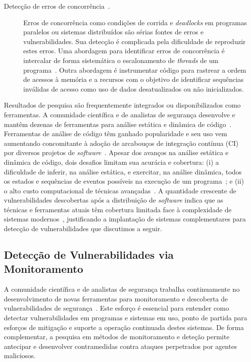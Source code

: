 \begin{description}
  \item[Detecção de erros de concorrência~\cite{silva2020shake, cai2021sound}.] Erros de concorrência como condições de corrida e \emph{deadlocks} em programas paralelos ou sistemas distribuídos são sérias fontes de erros e vulnerabilidades. Sua detecção é complicada pela dificuldade de reproduzir estes erros. Uma abordagem para identificar erros de concorrência é intercalar de forma sistemática o escalonamento de \emph{threads} de um programa~\cite{chen2020muzz, gong2021snowboard}. Outra abordagem é instrumentar código para rastrear a ordem de acessos à memória e a recursos com o objetivo de identificar sequências inválidas de acesso como uso de dados desatualizados ou não inicializados.

\end{description}

Resultados de pesquisa são frequentemente integrados ou disponibilizados como ferramentas. A comunidade científica e de analistas de segurança desenvolve e mantêm dezenas de ferramentas para análise estática e dinâmica de código~\cite{beller16static, gosain15dynamic}. Ferramentas de análise de código têm ganhado popularidade e seu uso vem aumentando concomitante à adoção de arcabouços de integração contínua (CI) por diversos projetos de \emph{software}~\cite{sadowski2018lessons, zampetti2017open}. Apesar dos avanços na análise estática e dinâmica de código, dois desafios limitam sua acurácia e cobertura: (i) a dificuldade de inferir, na análise estática, e exercitar, na análise dinâmica, todos os estados e sequências de eventos possíveis na execução de um programa~\cite{chen2020muzz}; e (ii) o alto custo computacional de técnicas avançadas~\cite{stein2021demanded}.
A quantidade crescente de vulnerabilidades descobertas após a distribuição de \emph{software} indica que as técnicas e ferramentas atuais têm cobertura limitada face à complexidade de sistemas modernos~\cite{votipka18vuln, li18vuldeepecker}, justificando a implantação de sistemas complementares para detecção de vulnerabilidades que discutimos a seguir.

\subsection{Detecção de Vulnerabilidades via Monitoramento}\label{sec:art.detect}

A comunidade científica e de analistas de segurança trabalha continuamente no desenvolvimento de novas ferramentas para monitoramento e descoberta de vulnerabilidades de segurança~\cite{bau10scanning, doupe2010johnny, figueroa2020survey, roy2022survey}. Este esforço é essencial para entender como detectar vulnerabilidades em programas e sistemas em uso, ponto de partida para esforços de mitigação e suporte a operação continuada destes sistemas. De forma complementar, a pesquisa em métodos de monitoramento e deteção permite antecipar e desenvolver contramedidas contra ataques perpetrados por agentes maliciosos.


